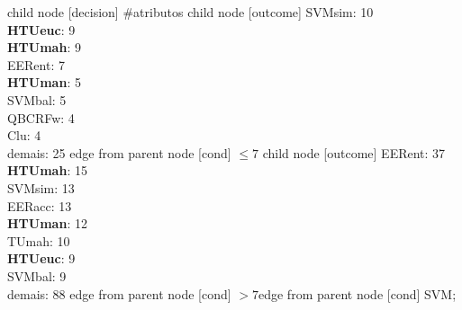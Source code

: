 child {node [decision] {\#atributos}
child {node [outcome] {
SVMsim: 10\\
\textbf{HTUeuc}: 9\\
\textbf{HTUmah}: 9\\
EERent: 7\\
\textbf{HTUman}: 5\\
SVMbal: 5\\
QBCRFw: 4\\
Clu: 4\\
demais: 25} edge from parent node [cond] {$\leq7$}}
child {node [outcome] {
EERent: 37\\
\textbf{HTUmah}: 15\\
SVMsim: 13\\
EERacc: 13\\
\textbf{HTUman}: 12\\
TUmah: 10\\
\textbf{HTUeuc}: 9\\
SVMbal: 9\\
demais: 88} edge from parent node [cond] {$>7$}}edge from parent node [cond] {SVM}};